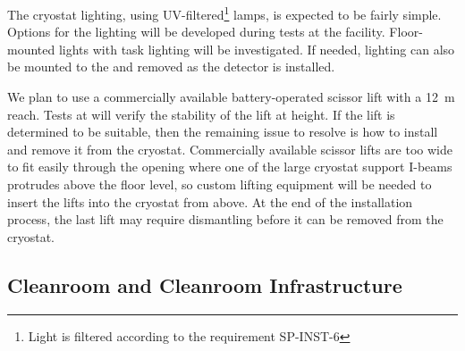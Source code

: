 The cryostat lighting, using UV-filtered\footnote{Light is filtered according to the requirement SP-INST-6}  lamps, is expected to be fairly simple. Options for the lighting will be developed during tests at the  facility.
Floor-mounted lights with task lighting will be investigated. If needed, lighting can also be mounted to the  and removed as the detector is installed.

We plan to use a commercially available battery-operated scissor lift with a \SI{12}{m} reach. Tests at  will verify the stability of the lift at height. If the lift is determined to be suitable, then the remaining issue to resolve is how to install and remove it from the cryostat. 
Commercially available scissor lifts are too wide to fit easily through the  opening where one of the large cryostat support I-beams protrudes above the  floor level,  so 
custom lifting equipment will be needed to insert the lifts into the cryostat from above. 
At the end of the installation process, the last lift may require dismantling before it can be removed from the cryostat.


\subsection{Cleanroom and Cleanroom Infrastructure}
\label{sec:fdsp-tc-infr-comm}

